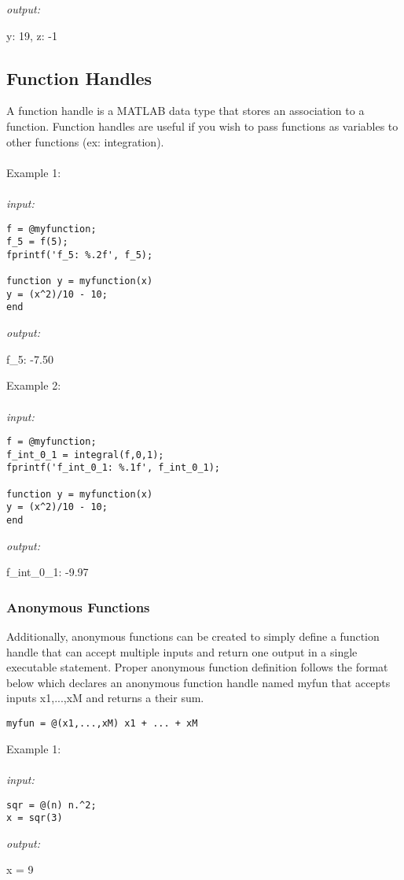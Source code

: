 \documentclass[../MATLAB_Primer.tex]{subfiles}
\begin{document}
\textit{output:}

\begin{center}
    y: 19, z: -1
\end{center}

\subsection{Function Handles}

A function handle is a MATLAB data type that stores an association to a function. Function handles are useful if you wish to pass functions as variables to other functions (ex: integration).
\\ \\
Example 1:
\\ \\
\textit{input:}
\begin{lstlisting}[frame=single]
f = @myfunction;
f_5 = f(5);
fprintf('f_5: %.2f', f_5);

function y = myfunction(x) 
y = (x^2)/10 - 10;
end
\end{lstlisting}

\textit{output:}

\begin{center}
    f\_5: -7.50
\end{center}

Example 2:
\\ \\
\textit{input:}
\begin{lstlisting}[frame=single]
f = @myfunction;
f_int_0_1 = integral(f,0,1);
fprintf('f_int_0_1: %.1f', f_int_0_1);

function y = myfunction(x) 
y = (x^2)/10 - 10;
end
\end{lstlisting}

\textit{output:}

\begin{center}
    f\_int\_0\_1: -9.97
\end{center}

\subsubsection{Anonymous Functions}

Additionally, anonymous functions can be created to simply define a function handle that can accept multiple inputs and return one output in a single executable statement. Proper anonymous function definition follows the format below which declares an anonymous function handle named myfun that accepts inputs x1,...,xM and returns a their sum.
\\
\begin{lstlisting}[frame=single]
myfun = @(x1,...,xM) x1 + ... + xM
\end{lstlisting}

Example 1:
\\ \\
\textit{input:}
\begin{lstlisting}[frame=single]
sqr = @(n) n.^2;
x = sqr(3)
\end{lstlisting}

\textit{output:}
\begin{center}
    x = 9
\end{center}
\end{document}
